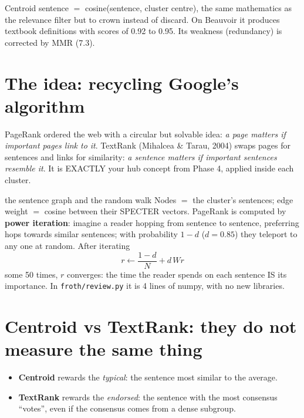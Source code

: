 \documentclass[11pt,a4paper]{article}
\begin{document}
\begin{resumen}
Centroid sentence $=$ cosine(sentence, cluster centre), the same mathematics as the relevance
filter but to crown instead of discard. On Beauvoir it produces textbook definitions with
scores of 0.92 to 0.95. Its weakness (redundancy) is corrected by MMR (7.3).
\end{resumen}
\clearpage
{}
{}

\section{The idea: recycling Google's algorithm}

PageRank ordered the web with a circular but solvable idea: \emph{a page matters if important
pages link to it}. TextRank (Mihalcea \& Tarau, 2004) swaps pages for sentences and links for
similarity: \emph{a sentence matters if important sentences resemble it}. It is EXACTLY your
hub concept from Phase 4, applied inside each cluster.

\begin{concepto}{the sentence graph and the random walk}
Nodes $=$ the cluster's sentences; edge weight $=$ cosine between their SPECTER vectors.
PageRank is computed by \textbf{power iteration}: imagine a reader hopping from sentence to
sentence, preferring hops towards similar sentences; with probability $1-d$ ($d=0.85$) they
teleport to any one at random. After iterating
\[
r \leftarrow \frac{1-d}{N} + d \, W r
\]
some 50 times, $r$ converges: the time the reader spends on each sentence IS its importance.
In \texttt{froth/review.py} it is 4 lines of numpy, with no new libraries.
\end{concepto}

\section{Centroid vs TextRank: they do not measure the same thing}

\begin{itemize}
  \item \textbf{Centroid} rewards the \emph{typical}: the sentence most similar to the average.
  \item \textbf{TextRank} rewards the \emph{endorsed}: the sentence with the most consensus
        ``votes'', even if the consensus comes from a dense subgroup.
\end{itemize}
\end{document}
